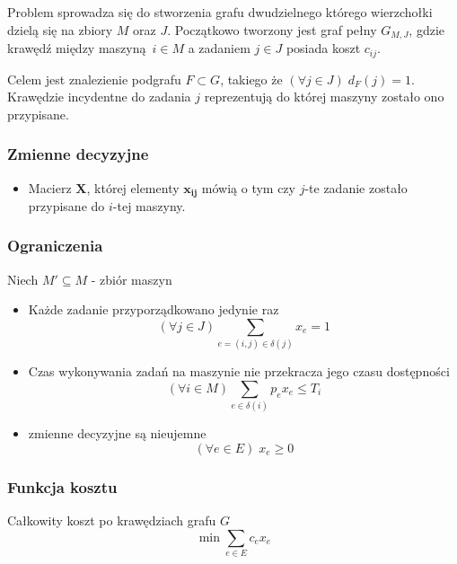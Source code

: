 \documentclass[a4paper,11pt]{article}
\theoremstyle{mytheor}
\begin{document}
Problem sprowadza się do stworzenia grafu dwudzielnego którego wierzchołki dzielą się na zbiory $M$ oraz $J$. Początkowo tworzony jest graf pełny $G_{M,J}$, gdzie krawędź między maszyną $i\in M$ a zadaniem $j\in J$ posiada koszt $c_{ij}$.

Celem jest znalezienie podgrafu $F\subset G$, takiego że $(\forall j\in J)\; d_F(j) = 1$. Krawędzie incydentne do zadania $j$ reprezentują do której maszyny zostało ono przypisane.

\subsubsection*{Zmienne decyzyjne}
\begin{itemize}
    \item Macierz $\mathbf{X}$, której elementy $\mathbf{x_{ij}}$ mówią o tym czy $j$-te zadanie zostało przypisane do $i$-tej maszyny.
\end{itemize}

\subsubsection*{Ograniczenia}
Niech $M' \subseteq M$ - zbiór maszyn
\begin{itemize}
    \item Każde zadanie przyporządkowano jedynie raz $$ (\forall j\in J) \sum_{e=(i,j)\in \delta(j)} x_e = 1 $$
    \item Czas wykonywania zadań na maszynie nie przekracza jego czasu dostępności $$ (\forall i\in M) \sum_{e\in \delta(i)} p_e x_e \leq T_i $$
    \item zmienne decyzyjne są nieujemne $$ (\forall e\in E)\; x_e \geq 0 $$
\end{itemize}

\subsubsection*{Funkcja kosztu}
Całkowity koszt po krawędziach grafu $G$
$$ \min \sum_{e\in E} c_e x_e $$
\end{document}
